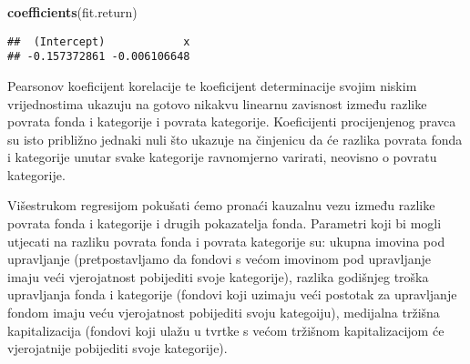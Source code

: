 \documentclass[
]{article}
\newenvironment{Shaded}{\begin{snugshade}}{\end{snugshade}}
\newcommand{\KeywordTok}[1]{\textcolor[rgb]{0.13,0.29,0.53}{\textbf{#1}}}
\newcommand{\NormalTok}[1]{#1}
\newcommand{\OperatorTok}[1]{\textcolor[rgb]{0.81,0.36,0.00}{\textbf{#1}}}
\newcommand{\StringTok}[1]{\textcolor[rgb]{0.31,0.60,0.02}{#1}}
\begin{document}
\begin{Shaded}
\begin{Highlighting}[]
\KeywordTok{coefficients}\NormalTok{(fit.return)}
\end{Highlighting}
\end{Shaded}

\begin{verbatim}
##  (Intercept)            x 
## -0.157372861 -0.006106648
\end{verbatim}

Pearsonov koeficijent korelacije te koeficijent determinacije svojim
niskim vrijednostima ukazuju na gotovo nikakvu linearnu zavisnost između
razlike povrata fonda i kategorije i povrata kategorije. Koeficijenti
procijenjenog pravca su isto približno jednaki nuli što ukazuje na
činjenicu da će razlika povrata fonda i kategorije unutar svake
kategorije ravnomjerno varirati, neovisno o povratu kategorije.

Višestrukom regresijom pokušati ćemo pronaći kauzalnu vezu između
razlike povrata fonda i kategorije i drugih pokazatelja fonda. Parametri
koji bi mogli utjecati na razliku povrata fonda i povrata kategorije su:
ukupna imovina pod upravljanje (pretpostavljamo da fondovi s većom
imovinom pod upravljanje imaju veći vjerojatnost pobijediti svoje
kategorije), razlika godišnjeg troška upravljanja fonda i kategorije
(fondovi koji uzimaju veći postotak za upravljanje fondom imaju veću
vjerojatnost pobijediti svoju kategoiju), medijalna tržišna
kapitalizacija (fondovi koji ulažu u tvrtke s većom tržišnom
kapitalizacijom će vjerojatnije pobijediti svoje kategorije).

\begin{Shaded}
\end{Shaded}
\end{document}
